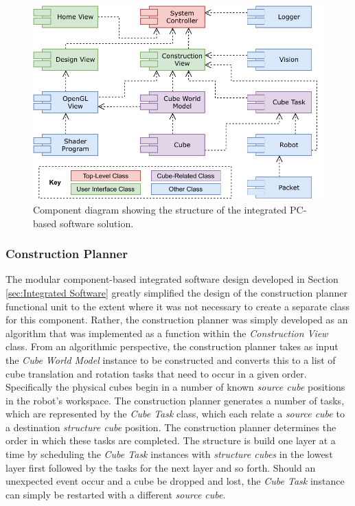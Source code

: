 \begin{figure}[!ht]
	\centering
	\includegraphics[scale=1]{figures/component-diagram.pdf}
	\caption{Component diagram showing the structure of the integrated PC-based software solution.}
	\label{fig:component-diagram}
\end{figure}

\subsubsection{Construction Planner} \label{sec:Construction Planner}

The modular component-based integrated software design developed in Section \ref{sec:Integrated Software} greatly simplified the design of the construction planner functional unit to the extent where it was not necessary to create a separate class for this component. Rather, the construction planner was simply developed as an algorithm that was implemented as a function within the \textit{Construction View} class. From an algorithmic perspective, the construction planner takes as input the \textit{Cube World Model} instance to be constructed and converts this to a list of cube translation and rotation tasks that need to occur in a given order. Specifically the physical cubes begin in a number of known \textit{source cube} positions in the robot's workspace. The construction planner generates a number of tasks, which are represented by the \textit{Cube Task} class, which each relate a \textit{source cube} to a destination \textit{structure cube} position. The construction planner determines the order in which these tasks are completed. The structure is build one layer at a time by scheduling the \textit{Cube Task} instances with \textit{structure cubes} in the lowest layer first followed by the tasks for the next layer and so forth. Should an unexpected event occur and a cube be dropped and lost, the \textit{Cube Task} instance can simply be restarted with a different \textit{source cube}.

